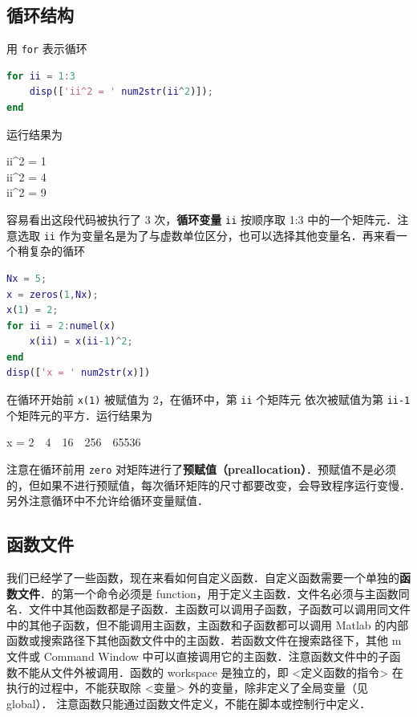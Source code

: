 \subsection{循环结构}
用 \texttt{for} 表示循环
\begin{lstlisting}[language=Matlab]
for ii = 1:3
    disp(['ii^2 = ' num2str(ii^2)]);
end
\end{lstlisting}
运行结果为
\begin{Command}
ii\^{}2 = 1 \\
ii\^{}2 = 4 \\
ii\^{}2 = 9 
\end{Command}
容易看出这段代码被执行了 3 次，\textbf{循环变量} \texttt{ii} 按顺序取 1:3 中的一个矩阵元．注意选取 \texttt{ii} 作为变量名是为了与虚数单位区分，也可以选择其他变量名．再来看一个稍复杂的循环
\begin{lstlisting}[language=Matlab]
Nx = 5;
x = zeros(1,Nx); 
x(1) = 2;
for ii = 2:numel(x)
    x(ii) = x(ii-1)^2;
end
disp(['x = ' num2str(x)])
\end{lstlisting}
在循环开始前 \texttt{x(1)} 被赋值为 2，在循环中，第 \texttt{ii} 个矩阵元 依次被赋值为第 \texttt{ii-1} 个矩阵元的平方．运行结果为
\begin{Command}
x = 2\ \ 4\ \ 16\ \ 256\ \ 65536
\end{Command}
注意在循环前用 \texttt{zero} 对矩阵进行了\textbf{预赋值（preallocation）}．预赋值不是必须的，但如果不进行预赋值，每次循环矩阵的尺寸都要改变，会导致程序运行变慢．另外注意循环中不允许给循环变量赋值．

\subsection{函数文件}

我们已经学了一些函数，现在来看如何自定义函数．自定义函数需要一个单独的\textbf{函数文件}．的第一个命令必须是 function，用于定义主函数．文件名必须与主函数同名．文件中其他函数都是子函数．主函数可以调用子函数，子函数可以调用同文件中的其他子函数，但不能调用主函数，主函数和子函数都可以调用 Matlab 的内部函数或搜索路径下其他函数文件中的主函数．若函数文件在搜索路径下，其他 m 文件或 Command Window 中可以直接调用它的主函数．注意函数文件中的子函数不能从文件外被调用．函数的 workspace 是独立的，即 <定义函数的指令> 在执行的过程中，不能获取除 <变量> 外的变量，除非定义了全局变量（见 global）． %
注意函数只能通过函数文件定义，不能在脚本或控制行中定义．

